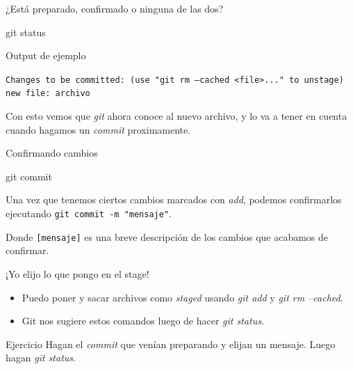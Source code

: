 \begin{frame}[fragile, t]{¿Está preparado, confirmado o ninguna de las dos?}
    \begin{comando}
        git status
    \end{comando}
    \begin{block}{Output de ejemplo}
            \begin{center}
            \texttt{Changes to be committed:
  (use "git rm --cached <file>..." to unstage)
        \\new file:  archivo}
            \end{center}
        \end{block}
   \begin{block}{}
       Con esto vemos que \textit{git} ahora conoce al nuevo archivo, y lo va a tener en cuenta cuando hagamos un \textit{commit} proximamente.
   \end{block}     

   \pause
\end{frame}

\begin{frame}[t]{Confirmando cambios}
    \begin{comando}
        git commit
    \end{comando}

    \pause
    \begin{block}{}
        Una vez que tenemos ciertos cambios marcados con \textit{add}, podemos confirmarlos
        ejecutando \texttt{git commit -m "mensaje"}.

        \vspace{0.5em}

        Donde \texttt{[mensaje]} es una breve descripción de los cambios que acabamos de confirmar.
    \end{block}
    \pause
    \begin{resumen}{¡Yo elijo lo que pongo en el stage!}
        \begin{itemize}
            \item Puedo poner y sacar archivos como \textit{staged} usando \textit{git add} y \textit{git rm --cached}.
            \item Git nos sugiere estos comandos luego de hacer \textit{git status}.
        \end{itemize}    
    \end{resumen}
    \pause
    \begin{ejercicio}{Ejercicio}
        Hagan el \textit{commit} que venían preparando y elijan un mensaje. Luego hagan \textit{git status}.
    \end{ejercicio}
\end{frame}

